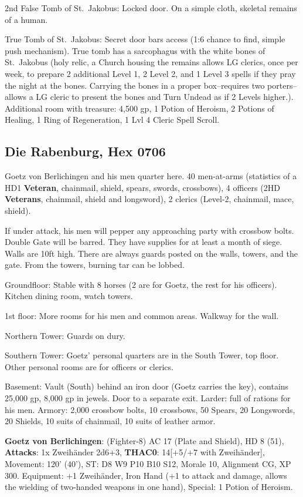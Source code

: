 \documentclass[
]{book}
\begin{document}
2nd False Tomb of St.~Jakobus: Locked door. On a simple cloth, skeletal remains of a human.

True Tomb of St.~Jakobus: Secret door bars access (1:6 chance to find, simple push mechanism). True tomb has a sarcophagus with the white bones of St.~Jakobus (holy relic, a Church housing the remains allows LG clerics, once per week, to prepare 2 additional Level 1, 2 Level 2, and 1 Level 3 spells if they pray the night at the bones. Carrying the bones in a proper box--requires two porters--allows a LG cleric to present the bones and Turn Undead as if 2 Levels higher.). Additional room with treasure: 4,500 gp, 1 Potion of Heroism, 2 Potions of Healing, 1 Ring of Regeneration, 1 Lvl 4 Cleric Spell Scroll.

\subsection{\texorpdfstring{Die Rabenburg, \textbf{Hex 0706}}{Die Rabenburg, Hex 0706}}\label{die-rabenburg-hex-0706}

Goetz von Berlichingen and his men quarter here. 40 men-at-arms (statistics of a HD1 \textbf{Veteran}, chainmail, shield, spears, swords, crossbows), 4 officers (2HD \textbf{Veterans}, chainmail, shield and longsword), 2 clerics (Level-2, chainmail, mace, shield).

If under attack, his men will pepper any approaching party with crossbow bolts. Double Gate will be barred. They have supplies for at least a month of siege. Walls are 10ft high. There are always guards posted on the walls, towers, and the gate. From the towers, burning tar can be lobbed.

Groundfloor: Stable with 8 horses (2 are for Goetz, the rest for his officers). Kitchen dining room, watch towers.

1st floor: More rooms for his men and common areas. Walkway for the wall.

Northern Tower: Guards on dury.

Southern Tower: Goetz' personal quarters are in the South Tower, top floor. Other personal rooms are for officers or clerics.

Basement: Vault (South) behind an iron door (Goetz carries the key), contains 25,000 gp, 8,000 gp in jewels. Door to a separate exit. Larder: full of rations for his men. Armory: 2,000 crossbow bolts, 10 crossbows, 50 Spears, 20 Longswords, 20 Shields, 10 suits of chainmail, 10 suits of leather armor.

\textbf{Goetz von Berlichingen}: (Fighter-8) AC 17 (Plate and Shield), HD 8 (51), \textbf{Attacks}: 1x Zweihänder 2d6+3, \textbf{THAC0}: 14{[}+5/+7 with Zweihänder{]}, Movement: 120' (40'), ST: D8 W9 P10 B10 S12, Morale 10, Alignment CG, XP 300. Equipment: +1 Zweihänder, Iron Hand (+1 to attack and damage, allows the wielding of two-handed weapons in one hand), Special: 1 Potion of Heroism.
\end{document}
